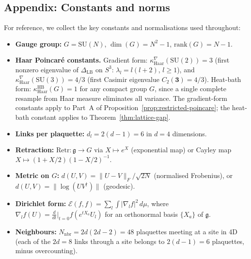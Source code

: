 \documentclass[12pt,a4paper]{article}
\theoremstyle{definition}
\theoremstyle{plain}
\theoremstyle{remark}
\begin{document}
\subsection*{Appendix: Constants and norms}
\label{app:constants}

For reference, we collect the key constants and normalisations used throughout:

\begin{itemize}
\item \textbf{Gauge group:} $G = \mathrm{SU}(N)$, $\dim(G) = N^2 - 1$, $\mathrm{rank}(G) = N-1$.
\item \textbf{Haar Poincar\'e constants.}
Gradient form:
$\kappa_{\mathrm{Haar}}^{\nabla}(\mathrm{SU}(2)) = 3$
(first nonzero eigenvalue of $\Delta_{\mathrm{LB}}$ on $S^3$:
$\lambda_l = l(l+2)$, $l \geq 1$), and
$\kappa_{\mathrm{Haar}}^{\nabla}(\mathrm{SU}(3)) = 4/3$
(first Casimir eigenvalue $C_2(\mathbf{3}) = 4/3$).
Heat-bath form:
$\kappa_{\mathrm{Haar}}^{\mathrm{HB}}(G) = 1$ for any compact group $G$,
since a single complete resample from Haar measure eliminates all variance.
The gradient-form constants apply to Part~A of
Proposition~\ref{prop:restricted-poincare}; the heat-bath constant applies
to Theorem~\ref{thm:lattice-gap}.
\item \textbf{Links per plaquette:} $d_l = 2(d-1) = 6$ in $d = 4$ dimensions.
\item \textbf{Retraction:} $\mathrm{Retr}: \mathfrak{g} \to G$ via $X \mapsto e^X$ (exponential map) or Cayley map $X \mapsto (1 + X/2)(1 - X/2)^{-1}$.
\item \textbf{Metric on $G$:} $d(U, V) = \|U - V\|_F / \sqrt{2N}$ (normalised Frobenius), or $d(U, V) = \|\log(U V^\dagger)\|$ (geodesic).
\item \textbf{Dirichlet form:} $\mathcal{E}(f, f) = \sum_l \int |\nabla_l f|^2 \, d\mu$, where $\nabla_l f(U) = \frac{d}{dt}\big|_{t=0} f(e^{tX_a} U_l)$ for an orthonormal basis $\{X_a\}$ of $\mathfrak{g}$.
\item \textbf{Neighbours:} $N_{\mathrm{nbr}} = 2d(2d - 2) = 48$ plaquettes meeting at a site in 4D (each of the $2d = 8$ links through a site belongs to $2(d-1) = 6$ plaquettes, minus overcounting).
\end{itemize}
\end{document}
